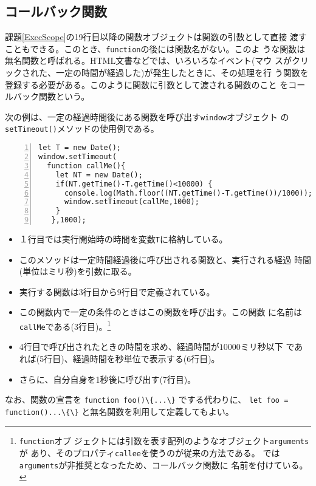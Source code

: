 \subsection{コールバック関数}
課題\ref{ExecScope}の19行目以降の関数オブジェクトは関数の引数として直接
渡すこともできる。このとき、\Verb+function+の後には関数名がない。このよ
うな関数は無名関数と呼ばれる。HTML文書などでは、いろいろなイベント(マウ
スがクリックされた、一定の時間が経過した)が発生したときに、その処理を行
う関数を登録する必要がある。このように関数に引数として渡される関数のこと
をコールバック関数という。
\begin{Exec}\upshape
 次の例は、一定の経過時間後にある関数を呼び出す\Verb+window+オブジェクト
 の\Verb+setTimeout()+メソッドの使用例である。
\begin{Verbatim}[numbers=left]
let T = new Date();
window.setTimeout(
  function callMe(){
    let NT = new Date();
    if(NT.getTime()-T.getTime()<10000) {
      console.log(Math.floor((NT.getTime()-T.getTime())/1000));
      window.setTimeout(callMe,1000);
    }
   },1000);
\end{Verbatim}
\begin{itemize}
 \item １行目では実行開始時の時間を変数\Verb+T+に格納している。
 \item このメソッドは一定時間経過後に呼び出される関数と、実行される経過
       時間(単位はミリ秒)を引数に取る。
 \item 実行する関数は3行目から9行目で定義されている。
 \item この関数内で一定の条件のときはこの関数を呼び出す。この関数
       に名前は\Verb+callMe+である(3行目)。\footnote{\Verb+function+オブ
       ジェクトには引数を表す配列のようなオブジェクト\Verb+arguments+が
       あり、そのプロパティ\texttt{callee}を使うのが従来の方法である。
       \ES では\Verb+arguments+が非推奨となったため、コールバック関数に
       名前を付けている。}
 \item 4行目で呼び出されたときの時間を求め、経過時間が$10000$ミリ秒以下
       であれば(5行目)、経過時間を秒単位で表示する(6行目)。
 \item さらに、自分自身を1秒後に呼び出す(7行目)。

\iffalse			 非\Strict では
       \Verb+arguments+を仮引数としてもつ関数を\Verb+arguments.callee+で
       呼び出すことができる。つまり自分自身を呼び出せることとなる。
       \Strict では\Verb+arguments.callee+は使用できないので3行目の関数
       に名前を付けてその関数名を\Verb+arguments.callee+の代わりに用いる
       必要がある。
			 \fi
\end{itemize}
\end{Exec}
なお、関数の宣言を {\Verb+function foo()\{...\}+} でする代わりに、
{\Verb+let foo = function()...\{\}+} と無名関数を利用して定義してもよい。

